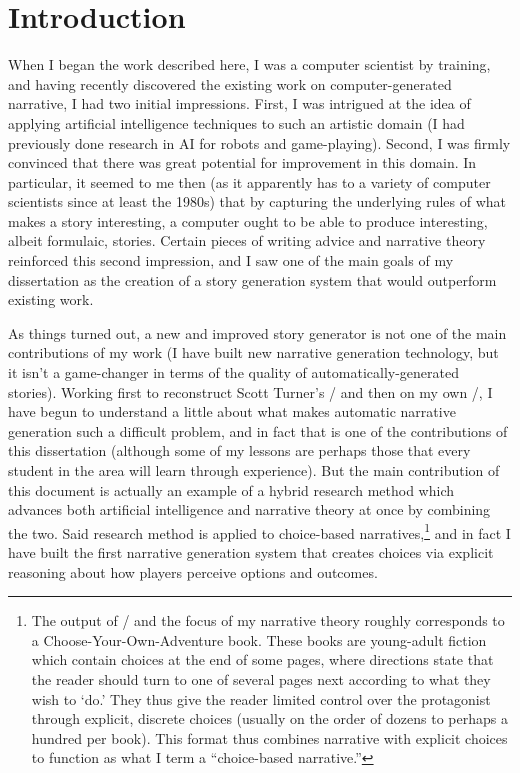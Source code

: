 \chapter{Introduction}

\label{ch:intro}

When I began the work described here, I was a computer scientist by training, and having recently discovered the existing work on computer-generated narrative, I had two initial impressions.
%
First, I was intrigued at the idea of applying artificial intelligence techniques to such an artistic domain (I had previously done research in AI for robots and game-playing).
%
Second, I was firmly convinced that there was great potential for improvement in this domain.
%
In particular, it seemed to me then (as it apparently has to a variety of computer scientists since at least the 1980s) that by capturing the underlying rules of what makes a story interesting, a computer ought to be able to produce interesting, albeit formulaic, stories.
%
Certain pieces of writing advice and narrative theory reinforced this second impression, and I saw one of the main goals of my dissertation as the creation of a story generation system that would outperform existing work.


As things turned out, a new and improved story generator is not one of the main contributions of my work (I have built new narrative generation technology, but it isn't a game-changer in terms of the quality of automatically-generated stories).
%
Working first to reconstruct Scott Turner's \minstrel/ \citep{Turner1993} and then on my own \dunyazad/, I have begun to understand a little about what makes automatic narrative generation such a difficult problem, and in fact that is one of the contributions of this dissertation (although some of my lessons are perhaps those that every student in the area will learn through experience).
%
But the main contribution of this document is actually an example of a hybrid research method which advances both artificial intelligence and narrative theory at once by combining the two.
%
Said research method is applied to choice-based narratives,\footnote{
The output of \dunyazad/ and the focus of my narrative theory roughly corresponds to a Choose-Your-Own-Adventure book.
%
These books are young-adult fiction which contain choices at the end of some pages, where directions state that the reader should turn to one of several pages next according to what they wish to `do.'
%
They thus give the reader limited control over the protagonist through explicit, discrete choices (usually on the order of dozens to perhaps a hundred per book).
%
This format thus combines narrative with explicit choices to function as what I term a ``choice-based narrative.''}
%
and in fact I have built the first narrative generation system that creates choices via explicit reasoning about how players perceive options and outcomes.


